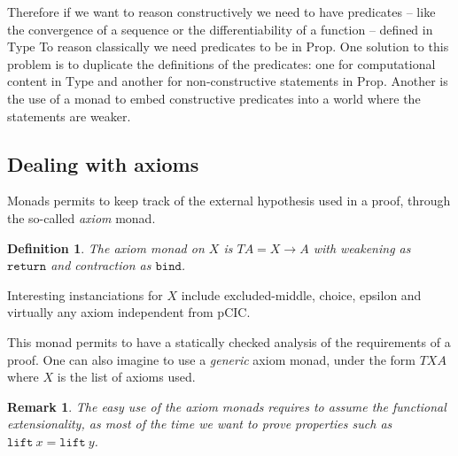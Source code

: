 \documentclass[a4paper,11pt]{article}
\newcommand{\N}{\mathbb{N}}
\newcommand{\Type}{\mbox{Type}}
\newcommand{\Prop}{\mbox{Prop}}
\newtheorem{definition}{Definition}
\newtheorem{remark}{Remark}
\theoremstyle{definition}
\theoremstyle{remark}
\begin{document}
Therefore if we want to reason constructively we need to have predicates -- like the convergence of a sequence or the differentiability of a function -- defined in $\Type$ To reason classically we need predicates to be in $\Prop$. One solution to this problem is to duplicate the definitions of the predicates: one for computational content in $\Type$ and another for non-constructive statements in $\Prop$. Another is the use of a monad to embed constructive predicates into a world where the statements are weaker.





\subsection{Dealing with axioms}

Monads permits to keep track of the external hypothesis used in a proof, through the so-called \emph{axiom} monad.

\begin{definition}
  The axiom monad on $X$ is $T A = X \rightarrow A$ with weakening as $\mathtt{return}$ and contraction as $\mathtt{bind}$.
\end{definition}

Interesting instanciations for $X$ include excluded-middle, choice, epsilon and virtually any axiom independent from pCIC.

This monad permits to have a statically checked analysis of the requirements of a proof. One can also imagine to use a \emph{generic} axiom monad, under the form $T X A$ where $X$ is the list of axioms used.

\begin{remark}
  The easy use of the axiom monads requires to assume the functional extensionality, as most of the time we want to prove properties such as $\mathtt{lift}\ x = \mathtt{lift}\ y$.
\end{remark} %
\end{document}
